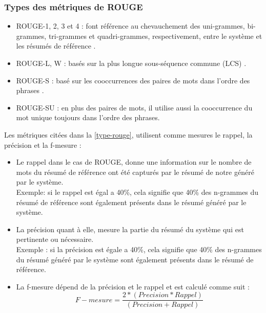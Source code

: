         \subsubsection{Types des métriques de ROUGE\label{type-rouge}}
        \begin{itemize}
            \item{ROUGE-1, 2, 3 et 4 : font référence au chevauchement des uni-grammes, bi-grammes, tri-grammes et quadri-grammes, respectivement, entre le système et les résumés de référence \cite{rouge1}.}\\
            \item{ROUGE-L, W : basés sur la plus longue sous-séquence commune (LCS) \cite{rouge2}.}\\
            \item{ROUGE-S : basé sur les cooccurrences des paires de mots dans l'ordre des phrases \cite{rouge2}.}\\
            \item{ROUGE-SU : en plus des paires de mots, il utilise aussi la cooccurrence du mot unique toujours dans l'ordre des phrases.}
        \end{itemize}

        Les métriques citées dans la \autoref{type-rouge}, utilisent comme mesures le rappel, la précision et la f-mesure :  
        \begin{itemize}
            
            \item {Le rappel dans le cas de ROUGE, donne une information sur le nombre de mots du résumé de référence ont été capturés par le résumé de notre généré par le système.\\ 
                Exemple: si le rappel est égal a 40\%, cela signifie que 40\% des n-grammes du résumé de référence sont également présents dans le résumé généré par le système.}\\
            \item {La précision quant à elle, mesure la partie du résumé du système qui est pertinente ou nécessaire.\\ 
                Exemple : si la précision est égale a 40\%, cela signifie que 40\% des n-grammes du résumé généré par le système sont également présents dans le résumé de référence.}
            \item {La f-mesure dépend de la précision et le rappel et est calculé comme suit :\\
                                \[ F-mesure = \frac{2 * (Precision * Rappel)} {(Precision + Rappel)} \]}

        \end{itemize}

